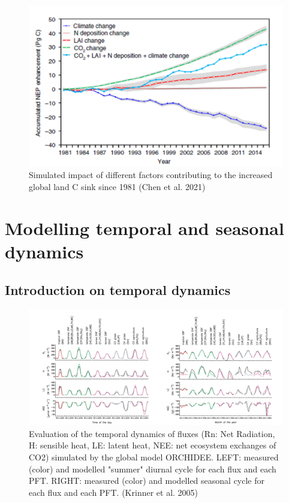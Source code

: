 \documentclass[12pt,oneside]{book}
\begin{document}
\begin{figure}

{\centering \includegraphics[width=0.8\linewidth]{figures/chap3/f335_chen2} 

}

\caption{Simulated impact of different factors contributing to the increased global land C sink since 1981 (Chen et al. 2021) }\label{fig:f335}
\end{figure}

\chapter{Modelling temporal and seasonal
dynamics}\label{modelling-temporal-and-seasonal-dynamics}


\section{Introduction on temporal
dynamics}\label{introduction-on-temporal-dynamics}

\begin{figure}

{\centering \includegraphics[width=0.8\linewidth]{figures/chap4/f41_Krinner} 

}

\caption{Evaluation of the temporal dynamics of fluxes (Rn: Net Radiation, H: sensible heat, LE: latent heat, NEE: net ecosystem exchanges of CO2) simulated by the global model ORCHIDEE. LEFT: measured (color) and modelled "summer" diurnal cycle for each flux and each PFT. RIGHT: measured (color) and modelled seasonal cycle for each flux and each PFT. (Krinner et al. 2005)}\label{fig:f41}
\end{figure}
\end{document}
